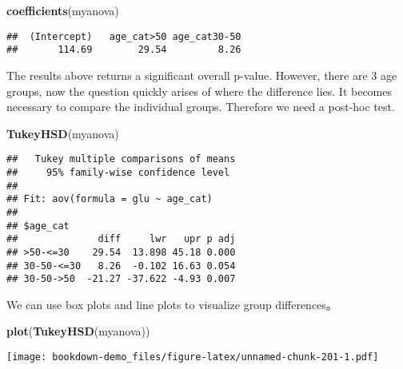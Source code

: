 \documentclass[]{book}
\newenvironment{Shaded}{\begin{snugshade}}{\end{snugshade}}
\newcommand{\KeywordTok}[1]{\textcolor[rgb]{0.13,0.29,0.53}{\textbf{#1}}}
\newcommand{\DataTypeTok}[1]{\textcolor[rgb]{0.13,0.29,0.53}{#1}}
\newcommand{\CharTok}[1]{\textcolor[rgb]{0.31,0.60,0.02}{#1}}
\newcommand{\StringTok}[1]{\textcolor[rgb]{0.31,0.60,0.02}{#1}}
\newcommand{\CommentTok}[1]{\textcolor[rgb]{0.56,0.35,0.01}{\textit{#1}}}
\newcommand{\OperatorTok}[1]{\textcolor[rgb]{0.81,0.36,0.00}{\textbf{#1}}}
\newcommand{\NormalTok}[1]{#1}
\theoremstyle{definition}
\theoremstyle{definition}
\theoremstyle{definition}
\theoremstyle{remark}
\begin{document}
\begin{Shaded}
\begin{Highlighting}[]
\KeywordTok{coefficients}\NormalTok{(myanova)}
\end{Highlighting}
\end{Shaded}

\begin{verbatim}
##  (Intercept)   age_cat>50 age_cat30-50 
##       114.69        29.54         8.26
\end{verbatim}

The results above returns a significant overall p-value. However, there
are 3 age groups, now the question quickly arises of where the
difference lies. It becomes necessary to compare the individual groups.
Therefore we need a post-hoc test.

\begin{Shaded}
\begin{Highlighting}[]
\KeywordTok{TukeyHSD}\NormalTok{(myanova)}
\end{Highlighting}
\end{Shaded}

\begin{verbatim}
##   Tukey multiple comparisons of means
##     95% family-wise confidence level
## 
## Fit: aov(formula = glu ~ age_cat)
## 
## $age_cat
##              diff     lwr   upr p adj
## >50-<=30    29.54  13.898 45.18 0.000
## 30-50-<=30   8.26  -0.102 16.63 0.054
## 30-50->50  -21.27 -37.622 -4.93 0.007
\end{verbatim}

\begin{Shaded}
\end{Shaded}

We can use box plots and line plots to visualize group differences。

\begin{Shaded}
\begin{Highlighting}[]
\KeywordTok{plot}\NormalTok{(}\KeywordTok{TukeyHSD}\NormalTok{(myanova))}
\end{Highlighting}
\end{Shaded}

\texttt{[image: bookdown-demo\_files/figure-latex/unnamed-chunk-201-1.pdf]}

\begin{Shaded}
\end{Shaded}
\end{document}
